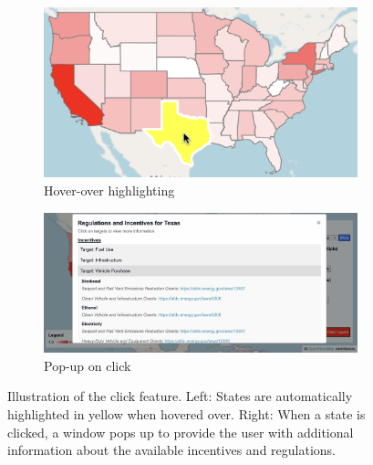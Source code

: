 \begin{figure}[H]
    \centering
    \begin{subfigure}[b]{0.49\textwidth}
        \centering
        \includegraphics[width=\textwidth]{figures/click_feature_highlight.png}
        \caption{Hover-over highlighting}
        \label{fig:click_feature_highlight}
    \end{subfigure}
    \hfill
    \begin{subfigure}[b]{0.49\textwidth}
        \centering
        \includegraphics[width=\textwidth]{figures/click_feature_popup.png}
        \caption{Pop-up on click}
        \label{fig:click_feature_popup}
    \end{subfigure}
    \caption{Illustration of the click feature. Left: States are automatically highlighted in yellow when hovered over. Right: When a state is clicked, a window pops up to provide the user with additional information about the available incentives and regulations. }
    \label{fig:click_feature}
\end{figure}

